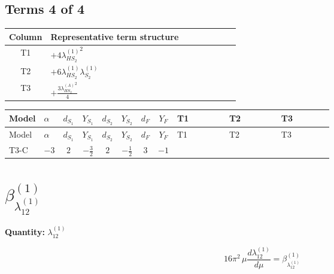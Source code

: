 \documentclass[8pt]{article}
\begin{document}
\begin{landscape}
\subsection*{Terms 4 of 4}
\begin{center}
\begin{tabular}{@{}c >{\raggedright\arraybackslash}p{0.82\linewidth}@{}}
\toprule
Column & Representative term structure \\
\midrule
T1 & \(\displaystyle +4 {\lambda_{HS_2}^{(1)}}^2\) \\
\midrule
T2 & \(\displaystyle +6 {\lambda_{HS_2}^{(1)}} {\lambda_{S_2}^{(1)}}\) \\
\midrule
T3 & \(\displaystyle +\frac{3 {\lambda_{HS_2}^{(A)}}^2}{4}\) \\
\midrule
\bottomrule
\end{tabular}
\end{center}
\smallskip
\tiny
\begin{longtable}{@{}llcccccc >{\raggedright\arraybackslash}p{0.21\linewidth} >{\raggedright\arraybackslash}p{0.21\linewidth} >{\raggedright\arraybackslash}p{0.21\linewidth}@{}}
\toprule
Model & $\alpha$ & $d_{S_1}$ & $Y_{S_1}$ & $d_{S_2}$ & $Y_{S_2}$ & $d_F$ & $Y_F$ & T1 & T2 & T3 \\
\midrule
\endfirsthead
\toprule
Model & $\alpha$ & $d_{S_1}$ & $Y_{S_1}$ & $d_{S_2}$ & $Y_{S_2}$ & $d_F$ & $Y_F$ & T1 & T2 & T3 \\
\midrule
\endhead
T3-C & $-3$ & $2$ & $-\frac{3}{2}$ & $2$ & $-\frac{1}{2}$ & $3$ & $-1$ & \scriptsize\adjustbox{max width=\linewidth}{$\begin{gathered} +4 {\lambda_{HS_2}^{(1)}}^2\end{gathered}$} & \scriptsize\adjustbox{max width=\linewidth}{$\begin{gathered} +6 {\lambda_{HS_2}^{(1)}} {\lambda_{S_2}^{(1)}}\end{gathered}$} & \scriptsize\adjustbox{max width=\linewidth}{$\begin{gathered} +\frac{3 {\lambda_{HS_2}^{(A)}}^2}{4}\end{gathered}$} \\
\midrule
\bottomrule
\end{longtable}
\clearpage
\section*{$\beta_{\lambda_{12}^{(1)}}^{(1)}$}
\noindent\textbf{Quantity: }$\lambda_{12}^{(1)}$\par\smallskip
\[16\pi^2\,\mu\frac{d \lambda_{12}^{(1)}}{d\mu}=\beta_{\lambda_{12}^{(1)}}^{(1)}\]

\end{landscape}
\end{document}

